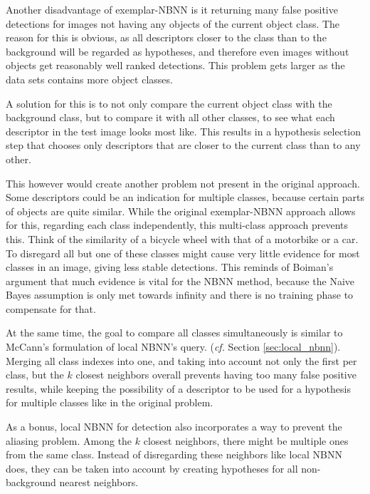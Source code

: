 
Another disadvantage of exemplar-NBNN is it returning many false positive detections for images not having any objects of the current object class. The reason for this is obvious, as all descriptors closer to the class than to the background will be regarded as hypotheses, and therefore even images without objects get reasonably well ranked detections. This problem gets larger as the data sets contains more object classes.

A solution for this is to not only compare the current object class with the background class, but to compare it with all other classes, to see what each descriptor in the test image looks most like. This results in a hypothesis selection step that chooses only descriptors that are closer to the current class than to any other.

This however would create another problem not present in the original approach. Some descriptors could be an indication for multiple classes, because certain parts of objects are quite similar. While the original exemplar-NBNN approach allows for this, regarding each class independently, this multi-class approach prevents this. Think of the similarity of a bicycle wheel with that of a motorbike or a car. To disregard all but one of these classes might cause very little evidence for most classes in an image, giving less stable detections. This reminds of Boiman's argument that much evidence is vital for the NBNN method, because the Naive Bayes assumption is only met towards infinity and there is no training phase to compensate for that.\cite{boiman2008defense}

At the same time, the goal to compare all classes simultaneously is similar to McCann's formulation of local NBNN's query.\cite{mccann2012local} (\emph{cf.} Section \ref{sec:local_nbnn}). Merging all class indexes into one, and taking into account not only the first per class, but the $k$ closest neighbors overall prevents having too many false positive results, while keeping the possibility of a descriptor to be used for a hypothesis for multiple classes like in the original problem.

As a bonus, local NBNN for detection also incorporates a way to prevent the aliasing problem. Among the $k$ closest neighbors, there might be multiple ones from the same class. Instead of disregarding these neighbors like local NBNN does, they can be taken into account by creating hypotheses for all non-background nearest neighbors.

